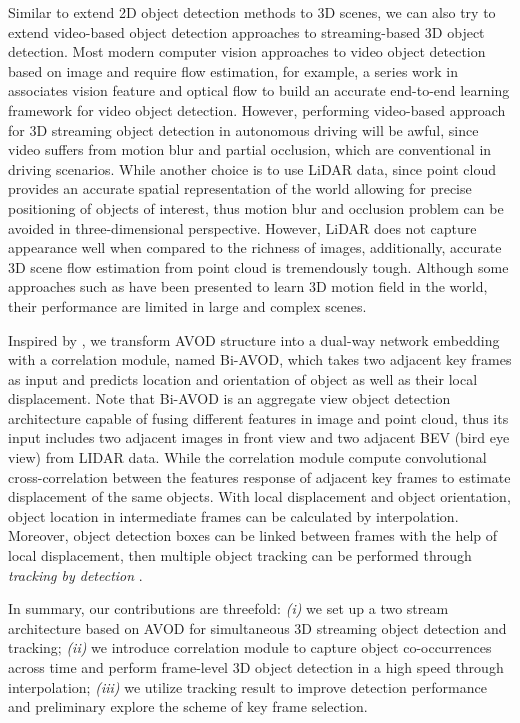 \documentclass{bmvc2k}
\begin{document}
Similar to extend 2D object detection methods to 3D scenes, we can also try to extend video-based object detection approaches to streaming-based 3D object detection. Most modern computer vision approaches to video object detection based on image and require flow estimation, for example, a series work in \cite{zhu2017flow,zhu2018towards} associates vision feature and optical flow to build an accurate end-to-end learning framework for video object detection. However, performing video-based approach for 3D streaming object detection in autonomous driving will be awful, since video suffers from motion blur and partial occlusion, which are conventional in driving scenarios. While another choice is to use LiDAR data, since point cloud provides an accurate spatial representation of the world allowing for precise positioning of objects of interest, thus motion blur and occlusion problem can be avoided in three-dimensional perspective. However, LiDAR does not capture appearance well when compared to the richness of images, additionally, accurate 3D scene flow estimation from point cloud is tremendously tough. Although some approaches such as \cite{liu2018learning, behl2018pointflownet} have been presented to learn 3D motion field in the world, their performance are limited in large and complex scenes. 

Inspired by \cite{feichtenhofer2017detect}, we transform AVOD \cite{ku2018joint} structure into 
a dual-way network embedding with a correlation module, named Bi-AVOD, which takes two adjacent key frames as input and predicts location and orientation of object as well as their local displacement. Note that Bi-AVOD is an aggregate view object detection architecture capable of fusing different features in image and point cloud, thus its input includes two adjacent images in front view and two adjacent BEV (bird eye view) from LIDAR data. While the correlation module compute convolutional cross-correlation between the features response of adjacent key frames to estimate displacement of the same objects. With local displacement and object orientation, object location in intermediate frames can be calculated by interpolation. Moreover, object detection boxes can be linked between frames with the help of local displacement, then multiple object tracking can be performed through \textit{tracking by detection} \cite{lenz2015followme}. 

In summary, our contributions are threefold: \textit{(i)} we set up a two stream architecture based on AVOD for simultaneous 3D streaming object detection and tracking; \textit{(ii)} we introduce correlation module to capture object co-occurrences across time and perform frame-level 3D object detection in a high speed through interpolation; \textit{(iii)} we utilize tracking result to improve detection performance and preliminary explore the scheme of key frame selection. 
\end{document}
